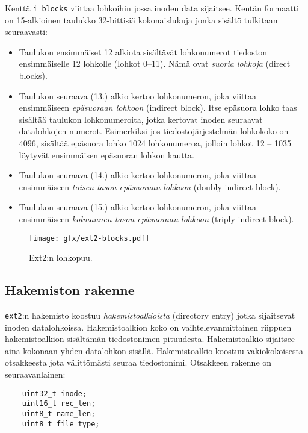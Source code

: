 Kenttä \texttt{i\_blocks} viittaa lohkoihin jossa inoden data sijaitsee.
Kentän formaatti on 15-alkioinen taulukko 32-bittisiä kokonaislukuja jonka sisältö tulkitaan seuraavasti:
\begin{itemize}
    \item Taulukon ensimmäiset 12 alkiota sisältävät lohkonumerot tiedoston ensimmäiselle 12 lohkolle (lohkot 0--11).
          Nämä ovat \emph{suoria lohkoja} (direct blocks).
    \item Taulukon seuraava (13.) alkio kertoo lohkonumeron, joka viittaa ensimmäiseen \emph{epäsuoraan lohkoon} (indirect block).
          Itse epäsuora lohko taas sisältää taulukon lohkonumeroita, jotka kertovat inoden seuraavat datalohkojen numerot.
          Esimerkiksi jos tiedostojärjestelmän lohkokoko on 4096, sisältää epäsuora lohko 1024 lohkonumeroa,
          jolloin lohkot 12 -- 1035 löytyvät ensimmäisen epäsuoran lohkon kautta.
    \item Taulukon seuraava (14.) alkio kertoo lohkonumeron, joka viittaa ensimmäiseen \emph{toisen tason epäsuoraan lohkoon} (doubly indirect block).

    \item Taulukon seuraava (15.) alkio kertoo lohkonumeron, joka viittaa ensimmäiseen \emph{kolmannen tason epäsuoraan lohkoon} (triply indirect block).
\end{itemize}

\begin{figure}
    \label{FigExt2BlockMap}
    \centering
    \texttt{[image: gfx/ext2-blocks.pdf]}
    \caption{Ext2:n lohkopuu.}
\end{figure}

\subsection{Hakemiston rakenne}
\texttt{ext2}:n hakemisto koostuu \emph{hakemistoalkioista} (directory entry) jotka sijaitsevat inoden datalohkoissa.
Hakemistoalkion koko on vaihtelevanmittainen riippuen hakemistoalkion sisältämän tiedostonimen pituudesta.
Hakemistoalkio sijaitsee aina kokonaan yhden datalohkon sisällä.
Hakemistoalkio koostuu vakiokokoisesta otsakkeesta jota välittömästi seuraa tiedostonimi.
Otsakkeen rakenne on seuraavanlainen:

\begin{verbatim}
	uint32_t inode;
	uint16_t rec_len;
	uint8_t name_len;
	uint8_t file_type;
\end{verbatim}


